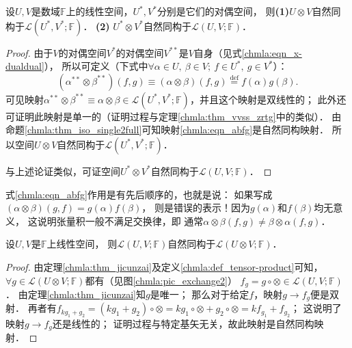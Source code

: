 \begin{proposition}\label{chmla:thm_v-vstar}
    设$U,V$是数域$\mathbb{F}$上的线性空间，$U^*, V^*$分别是它们的对偶空间，
    则{\bfseries (1)}$U\otimes V$自然同构于$\mathscr{L}(U^*,V^*;\mathbb{F})$．
    {\bfseries (2)} $U^*\otimes V^*$自然同构于$\mathscr{L}(U,V;\mathbb{F})$．
\end{proposition}
\begin{proof}
    由于$V$的对偶空间$V^*$的对偶空间$V^{**}$是$V$自身（见式\eqref{chmla:eqn_x-dualdual}），
    所以可定义（下式中$\forall \alpha\in U,\  \beta \in V; \  f\in U^*,\  g\in V^* $）：
\begin{equation}\label{chmla:eqn_abfg}
    (\alpha^{**} \otimes \beta^{**} )(f,g) \equiv
    (\alpha \otimes \beta )(f,g)
    \overset{\mathrm {def}}{=} f(\alpha)g(\beta) .
\end{equation}
    可见映射$\alpha^{**} \otimes \beta^{**}\equiv \alpha \otimes \beta
    \in \mathscr{L}(U^*,V^*;\mathbb{F})$，并且这个映射是双线性的；
    此外还可证明此映射是单一的（证明过程与定理\ref{chmla:thm_vvss_zrtg}中的类似）．
    由命题\ref{chmla:thm_iso_single2full}可知映射\eqref{chmla:eqn_abfg}是自然同构映射．
    所以空间$U\otimes V$自然同构于$\mathscr{L}(U^*,V^*;\mathbb{F})$．

    与上述论证类似，可证空间$U^*\otimes V^*$自然同构于$\mathscr{L}(U,V;\mathbb{F})$．
\end{proof}

\begin{remark}\label{chmla:rmk_noncom}
式\eqref{chmla:eqn_abfg}作用是有先后顺序的，也就是说：
如果写成$(\alpha \otimes \beta )(g,f) = g(\alpha)f(\beta)$，
则是错误的表示！因为$g(\alpha)$和$f(\beta)$均无意义，
这说明张量积一般不满足交换律，即
通常$\alpha \otimes \beta(f,g) \neq \beta\otimes\alpha(f,g)$．
\end{remark}


\begin{proposition}\label{chmla:thm_uvequv}
    设$U,V$是$\mathbb{F}$上线性空间，
    则$\mathscr{L}(U,V;\mathbb{F})$自然同构于$\mathscr{L}(U\otimes V;\mathbb{F})$．
\end{proposition}
\begin{proof}
    由定理\ref{chmla:thm_jicunzai}及定义\ref{chmla:def_tensor-product}可知，
    $\forall g \in \mathscr{L}(U\otimes V;\mathbb{F})$都有（见图\ref{chmla:pic_exchange2}）
    $f_g = g \circ \otimes \in \mathscr{L}(U,V;\mathbb{F})$．
    由定理\ref{chmla:thm_jicunzai}知$g$是唯一；
    那么对于给定$f$，映射$g\to f_g$便是双射．
    再者有$f_{k g_1+ g_2} = (k g_1+  g_2)\circ \otimes
     = k g_1\circ \otimes+  g_2\circ \otimes = k f_{g_1}+ f_{g_2}$；
    这说明了映射$g\to f_g$还是线性的；
    证明过程与特定基矢无关，故此映射是自然同构映射．
\end{proof}


